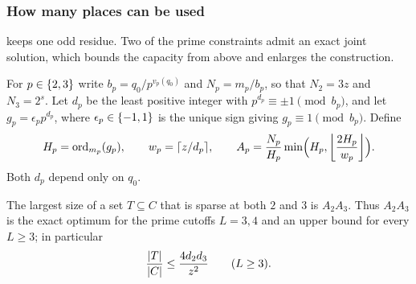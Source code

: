 \subsubsection*{How many places can be used}

 keeps one odd residue. Two of the prime constraints admit an
exact joint solution, which bounds the capacity from above and enlarges the
construction.

For $p\in\set{2,3}$ write $b_p=q_0/p^{v_p(q_0)}$ and $N_p=m_p/b_p$, so that $N_2=3z$ and
$N_3=2^s$. Let $d_p$ be the least positive integer with $p^{d_p}\equiv\pm1\pmod{b_p}$,
and let $g_p=\epsilon_pp^{d_p}$, where $\epsilon_p\in\set{-1,1}$ is the unique sign
giving $g_p\equiv1\pmod{b_p}$. Define
\[
 H_p=\ord_{m_p}(g_p),\qquad w_p=\ceil{z/d_p},\qquad
 A_p=\frac{N_p}{H_p}\min\Bigl(H_p,\floor*{\frac{2H_p}{w_p}}\Bigr).
\]
Both $d_p$ depend only on $q_0$.

\begin{theorem}\label{gpp:thm:sparsetwo}
The largest size of a set $T\subseteq C$ that is sparse at both $2$ and $3$ is $A_2A_3$.
Thus $A_2A_3$ is the exact optimum for the prime cutoffs $L=3,4$ and an upper bound for
every $L\ge3$; in particular
\[
 \frac{\abs{T}}{\abs{C}}\le\frac{4d_2d_3}{z^2}\qquad(L\ge3).
\]
\end{theorem}

